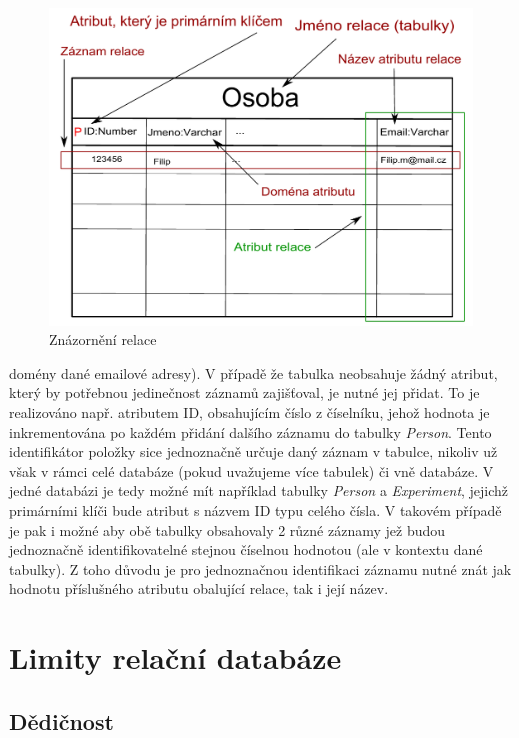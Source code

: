 \documentclass{projekt}
\begin{document}
\begin{figure}[htb]
\begin{center}
\includegraphics[scale=0.7]{relace.pdf}
\caption{Znázornění relace}
\end{center}
\end{figure}

domény dané emailové adresy). V případě že tabulka neobsahuje žádný atribut, který by potřebnou jedinečnost záznamů zajišťoval, je nutné jej přidat. To je realizováno např. atributem ID, obsahujícím číslo z číselníku, jehož hodnota je inkrementována po každém přidání dalšího záznamu do tabulky {\it Person}. Tento identifikátor položky sice jednoznačně určuje daný záznam v tabulce, nikoliv už však v rámci celé databáze (pokud uvažujeme více tabulek) či vně databáze. V jedné databázi je tedy možné mít například tabulky {\it Person} a {\it Experiment}, jejichž primárními klíči bude atribut s názvem ID typu celého čísla. V takovém případě je pak i možné aby obě tabulky obsahovaly 2 různé záznamy jež budou jednoznačně identifikovatelné stejnou číselnou hodnotou (ale v kontextu dané tabulky). Z toho důvodu je pro jednoznačnou identifikaci záznamu nutné znát jak hodnotu příslušného atributu obalující relace, tak i její název. 


\section{Limity relační databáze}

\subsection{Dědičnost}
\end{document}

